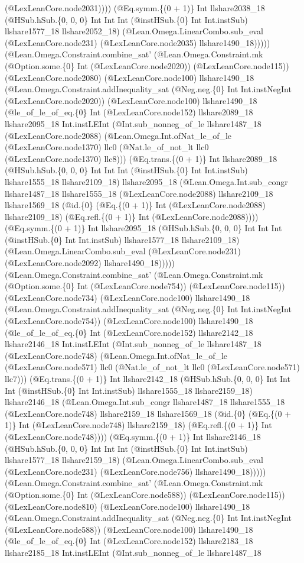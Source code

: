 \documentclass[11pt]{article}
\begin{document}
(@LexLeanCore.node2031)))) (@Eq.symm.\{(0 + 1)\} Int llshare2038\_18 (@HSub.hSub.\{0, 0, 0\} Int Int Int (@instHSub.\{0\} Int Int.instSub) llshare1577\_18 llshare2052\_18) (@Lean.Omega.LinearCombo.sub\_eval (@LexLeanCore.node231) (@LexLeanCore.node2035) llshare1490\_18))))) (@Lean.Omega.Constraint.combine\_sat' (@Lean.Omega.Constraint.mk (@Option.some.\{0\} Int (@LexLeanCore.node2020)) (@LexLeanCore.node115)) (@LexLeanCore.node2080) (@LexLeanCore.node100) llshare1490\_18 (@Lean.Omega.Constraint.addInequality\_sat (@Neg.neg.\{0\} Int Int.instNegInt (@LexLeanCore.node2020)) (@LexLeanCore.node100) llshare1490\_18 (@le\_of\_le\_of\_eq.\{0\} Int (@LexLeanCore.node152) llshare2089\_18 llshare2095\_18 Int.instLEInt (@Int.sub\_nonneg\_of\_le llshare1487\_18 (@LexLeanCore.node2088) (@Lean.Omega.Int.ofNat\_le\_of\_le (@LexLeanCore.node1370) llc0 (@Nat.le\_of\_not\_lt llc0 (@LexLeanCore.node1370) llc8))) (@Eq.trans.\{(0 + 1)\} Int llshare2089\_18 (@HSub.hSub.\{0, 0, 0\} Int Int Int (@instHSub.\{0\} Int Int.instSub) llshare1555\_18 llshare2109\_18) llshare2095\_18 (@Lean.Omega.Int.sub\_congr llshare1487\_18 llshare1555\_18 (@LexLeanCore.node2088) llshare2109\_18 llshare1569\_18 (@id.\{0\} (@Eq.\{(0 + 1)\} Int (@LexLeanCore.node2088) llshare2109\_18) (@Eq.refl.\{(0 + 1)\} Int (@LexLeanCore.node2088)))) (@Eq.symm.\{(0 + 1)\} Int llshare2095\_18 (@HSub.hSub.\{0, 0, 0\} Int Int Int (@instHSub.\{0\} Int Int.instSub) llshare1577\_18 llshare2109\_18) (@Lean.Omega.LinearCombo.sub\_eval (@LexLeanCore.node231) (@LexLeanCore.node2092) llshare1490\_18))))) (@Lean.Omega.Constraint.combine\_sat' (@Lean.Omega.Constraint.mk (@Option.some.\{0\} Int (@LexLeanCore.node754)) (@LexLeanCore.node115)) (@LexLeanCore.node734) (@LexLeanCore.node100) llshare1490\_18 (@Lean.Omega.Constraint.addInequality\_sat (@Neg.neg.\{0\} Int Int.instNegInt (@LexLeanCore.node754)) (@LexLeanCore.node100) llshare1490\_18 (@le\_of\_le\_of\_eq.\{0\} Int (@LexLeanCore.node152) llshare2142\_18 llshare2146\_18 Int.instLEInt (@Int.sub\_nonneg\_of\_le llshare1487\_18 (@LexLeanCore.node748) (@Lean.Omega.Int.ofNat\_le\_of\_le (@LexLeanCore.node571) llc0 (@Nat.le\_of\_not\_lt llc0 (@LexLeanCore.node571) llc7))) (@Eq.trans.\{(0 + 1)\} Int llshare2142\_18 (@HSub.hSub.\{0, 0, 0\} Int Int Int (@instHSub.\{0\} Int Int.instSub) llshare1555\_18 llshare2159\_18) llshare2146\_18 (@Lean.Omega.Int.sub\_congr llshare1487\_18 llshare1555\_18 (@LexLeanCore.node748) llshare2159\_18 llshare1569\_18 (@id.\{0\} (@Eq.\{(0 + 1)\} Int (@LexLeanCore.node748) llshare2159\_18) (@Eq.refl.\{(0 + 1)\} Int (@LexLeanCore.node748)))) (@Eq.symm.\{(0 + 1)\} Int llshare2146\_18 (@HSub.hSub.\{0, 0, 0\} Int Int Int (@instHSub.\{0\} Int Int.instSub) llshare1577\_18 llshare2159\_18) (@Lean.Omega.LinearCombo.sub\_eval (@LexLeanCore.node231) (@LexLeanCore.node756) llshare1490\_18))))) (@Lean.Omega.Constraint.combine\_sat' (@Lean.Omega.Constraint.mk (@Option.some.\{0\} Int (@LexLeanCore.node588)) (@LexLeanCore.node115)) (@LexLeanCore.node810) (@LexLeanCore.node100) llshare1490\_18 (@Lean.Omega.Constraint.addInequality\_sat (@Neg.neg.\{0\} Int Int.instNegInt (@LexLeanCore.node588)) (@LexLeanCore.node100) llshare1490\_18 (@le\_of\_le\_of\_eq.\{0\} Int (@LexLeanCore.node152) llshare2183\_18 llshare2185\_18 Int.instLEInt (@Int.sub\_nonneg\_of\_le llshare1487\_18 
\end{document}
